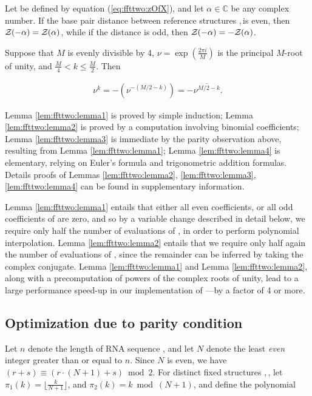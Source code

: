 \begin{lemma}
\label{lem:ffttwo:lemma3}
Let \emZ{} be defined by equation (\ref{eq:ffttwo:zOfX}), and
let $\alpha \in \mathbb{C}$ be any complex number.
If the base pair distance between reference
structures \strA,\,\strB is even, then ${\mathcal Z}_{}(-\alpha) = {\mathcal Z}_{}(\alpha)$,
while if
the distance is odd, then ${\mathcal Z}_{}(-\alpha) = -{\mathcal Z}_{}(\alpha)$.
\end{lemma}

\begin{lemma}
\label{lem:ffttwo:lemma4}
Suppose that $M$ is evenly divisible by 4,
$\nu = \exp(\frac{2 \pi i}{M})$ is the principal $M$-root of unity, and
$\frac{M}{4} < k \leq \frac{M}{2}$. Then

\begin{align}
\nu^k = -(\nu^{-(M/2-k)}) = -\overline{\nu^{M/2-k}}.
\end{align}
\end{lemma}

Lemma \ref{lem:ffttwo:lemma1} is proved by simple induction;
Lemma \ref{lem:ffttwo:lemma2}
is proved by a computation involving binomial coefficients;
Lemma \ref{lem:ffttwo:lemma3} is immediate
by the parity observation above, resulting from Lemma \ref{lem:ffttwo:lemma1};
Lemma \ref{lem:ffttwo:lemma4} is elementary, relying on Euler's
formula and trigonometric addition formulas. Details proofs of
Lemmas \ref{lem:ffttwo:lemma2}, \ref{lem:ffttwo:lemma3}, \ref{lem:ffttwo:lemma4}
can be found in supplementary information.

Lemma \ref{lem:ffttwo:lemma1}
entails that either all even coefficients, or all odd coefficients
of \emZ{} are zero, and so by a variable change described in detail below,
we require only half the number of evaluations of \emZ{}, in order to perform
polynomial interpolation.
Lemma \ref{lem:ffttwo:lemma2}
 entails that we require only half again the number of evaluations of
\emZ{}, since the remainder can be inferred by taking the complex conjugate.
Lemma \ref{lem:ffttwo:lemma1} and Lemma \ref{lem:ffttwo:lemma2},
along with a
precomputation of powers of the complex roots of unity, lead to a
large performance speed-up in our implementation of \ffttwo---by a factor
of 4 or more.

\subsection{Optimization due to parity condition}
\label{subsec:ffttwo:parity}

Let $n$ denote the length of RNA sequence \seq, and let $N$ denote the
least {\em even} integer greater than or equal to $n$. Since $N$ is even,
we have $(r+s) \equiv (r\cdot(N+1)+s) \bmod 2$. For distinct
fixed structures \strA,\,\strB, let
$\pi_1(k) = \lfloor \frac{k}{N+1} \rfloor$, and
$\pi_2(k) = k \bmod (N+1)$, and define the polynomial

